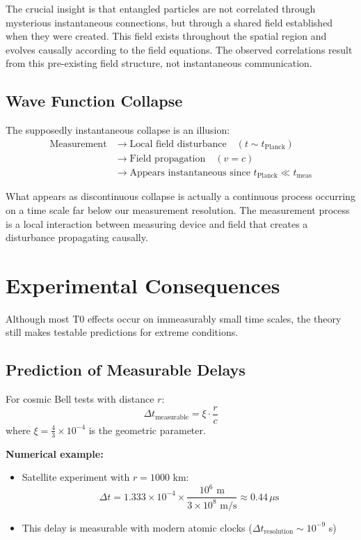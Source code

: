 	The crucial insight is that entangled particles are not correlated through mysterious instantaneous connections, but through a shared field established when they were created. This field exists throughout the spatial region and evolves causally according to the field equations. The observed correlations result from this pre-existing field structure, not instantaneous communication.
	
	\subsection{Wave Function Collapse}
	
	The supposedly instantaneous collapse is an illusion:
	\begin{align}
		\text{Measurement} &\rightarrow \text{Local field disturbance} \quad (t \sim t_{\text{Planck}}) \\
		&\rightarrow \text{Field propagation} \quad (v = c) \\
		&\rightarrow \text{Appears instantaneous since } t_{\text{Planck}} \ll t_{\text{meas}}
	\end{align}
	
	What appears as discontinuous collapse is actually a continuous process occurring on a time scale far below our measurement resolution. The measurement process is a local interaction between measuring device and field that creates a disturbance propagating causally.
	
	\section{Experimental Consequences}
	
	Although most T0 effects occur on immeasurably small time scales, the theory still makes testable predictions for extreme conditions.
	
	\subsection{Prediction of Measurable Delays}
	
	For cosmic Bell tests with distance $r$:
	\begin{equation}
		\Delta t_{\text{measurable}} = \xi \cdot \frac{r}{c}
	\end{equation}
	where $\xi = \frac{4}{3} \times 10^{-4}$ is the geometric parameter.
	
	\textbf{Numerical example:}
	\begin{itemize}
		\item Satellite experiment with $r = 1000$ km:
		\begin{equation}
			\Delta t = 1.333 \times 10^{-4} \times \frac{10^6 \text{ m}}{3 \times 10^8 \text{ m/s}} \approx 0.44 \, \mu\text{s}
		\end{equation}
		\item This delay is measurable with modern atomic clocks ($\Delta t_{\text{resolution}} \sim 10^{-9}$ s)
	\end{itemize}
	

